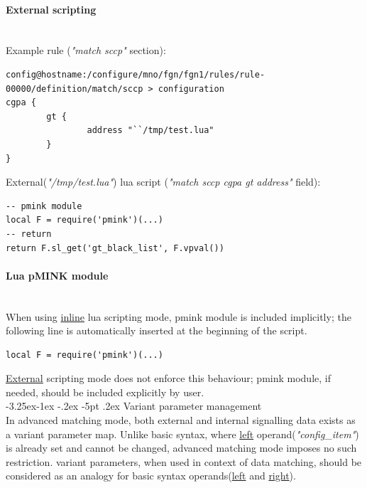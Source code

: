 \documentclass[a4paper,latin]{paper}
\makeatletter
\renewcommand\subparagraph{\@startsection{subparagraph}{5}{\z@}%
                                     {-3.25ex\@plus -1ex \@minus -.2ex}%
                                     {-5pt \@plus .2ex}%
                                     {\normalfont\normalsize\bfseries}}
\makeatother
\begin{document}
\paragraph{External scripting}
\mbox{}\\
\noindent{}Example rule (\textit{"match sccp"} section):
\begin{lstlisting}[style=BashInputStyle, belowskip=\baselineskip, upquote=true]
config@hostname:/configure/mno/fgn/fgn1/rules/rule-00000/definition/match/sccp > configuration 
cgpa {
        gt {
                address "``/tmp/test.lua"
        }                                   
}
\end{lstlisting}
\noindent{}External(\textit{"/tmp/test.lua"}) \Gls{lua} script (\textit{"match sccp cgpa gt address"} field):
\begin{lstlisting}[style=LuaInputStyle, belowskip=\baselineskip, upquote=true]
-- pmink module
local F = require('pmink')(...)
-- return
return F.sl_get('gt_black_list', F.vpval())
\end{lstlisting}

\paragraph{Lua pMINK module}\label{SECTION_LUA_MODULE}
\mbox{}\\
When using \underline{inline} \Gls{lua} scripting mode, \acrshort{pmink} module is included implicitly; the following line is automatically inserted at the beginning of the script.
\begin{lstlisting}[style=LuaInputStyle, belowskip=\baselineskip, upquote=true]
local F = require('pmink')(...)
\end{lstlisting}
\underline{External} scripting mode does not enforce this behaviour; \acrshort{pmink} module, if needed, should be included explicitly by user.\\

\subparagraph{Variant parameter management}
\mbox{}\\
In advanced matching mode, both external and internal signalling data exists as a \gls{variant} parameter map. Unlike basic syntax, where \underline{left} operand(\textit{"config\_item"})
is already set and cannot be changed, advanced matching mode imposes no such restriction. \Gls{variant} parameters, when used in context of data matching, should be considered
as an analogy for basic syntax operands(\underline{left} and \underline{right}).\\
\end{document}
